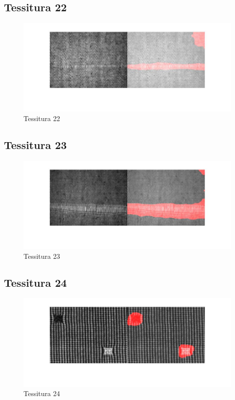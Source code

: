 \documentclass{article}
\begin{document}
\subsection{Tessitura 22}

\begin{figure}[h!]
	\centering
	\includegraphics[width=\textwidth]{results/res22.jpg}
	\caption{Tessitura 22}
\end{figure}

\newpage

\subsection{Tessitura 23}

\begin{figure}[h!]
	\centering
	\includegraphics[width=\textwidth]{results/res23.jpg}
	\caption{Tessitura 23}
\end{figure}


\subsection{Tessitura 24}

\begin{figure}[h!]
	\centering
	\includegraphics[width=\textwidth]{results/res24.jpg}
	\caption{Tessitura 24}
\end{figure}
\end{document}
